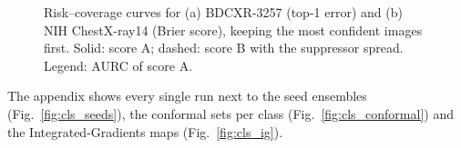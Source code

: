 \begin{table}[htbp]
\centering\small
\caption{Conformal prediction at nominal 0.90: Mondrian sets on BDCXR-3257 (coverage, mean set size of 3 classes) and false-negative risk
control on NIH (test false-negative rate, mean set size of 14 labels).}
\label{tab:cls_unc}
\end{table}

\begin{table}[htbp]
\centering\footnotesize
\caption{Selective classification: area under the risk--coverage curve (AURC; lower is better) with score A (one minus the ensemble
entropy), score A on the images that have a spread value, and score B (entropy and suppressor spread).}
\label{tab:cls_selective}
\end{table}

\begin{figure}[htbp]
\centering
{}
\caption{Risk--coverage curves for (a) BDCXR-3257 (top-1 error) and (b) NIH ChestX-ray14 (Brier score), keeping the most confident images
first. Solid: score A; dashed: score B with the suppressor spread. Legend: AURC of score A.}
\label{fig:cls_selective}
\end{figure}

The appendix shows every single run next to the seed ensembles (Fig.~\ref{fig:cls_seeds}), the conformal sets per class
(Fig.~\ref{fig:cls_conformal}) and the Integrated-Gradients maps (Fig.~\ref{fig:cls_ig}).
